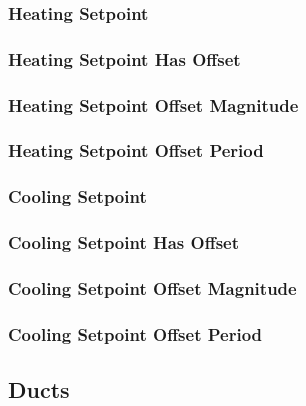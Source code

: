 \subsubsection{Heating Setpoint}


\subsubsection{Heating Setpoint Has Offset}


\subsubsection{Heating Setpoint Offset Magnitude}


\subsubsection{Heating Setpoint Offset Period}


\subsubsection{Cooling Setpoint}


\subsubsection{Cooling Setpoint Has Offset}


\subsubsection{Cooling Setpoint Offset Magnitude}


\subsubsection{Cooling Setpoint Offset Period}


\subsection{Ducts}
